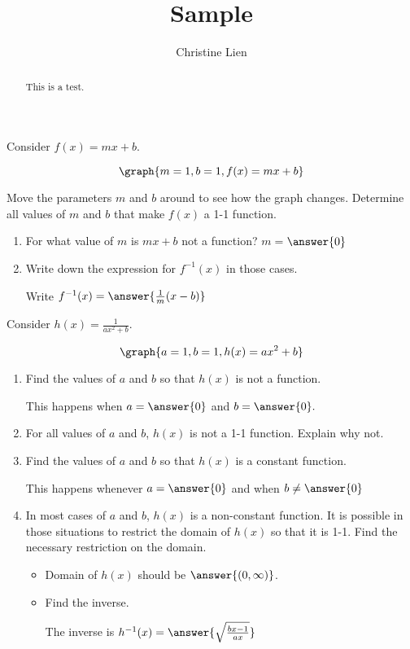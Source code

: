 \documentclass{ximera}
\title{Sample}
\author{Christine Lien}
\begin{document}
\begin{abstract}
This is a test. 
\end{abstract}
\maketitle

Consider $f(x)=mx+b$. 

\[\graph{m=1, b=1, f(x)=mx+b}\]

Move the parameters $m$ and $b$ around to see how the graph changes. 
Determine all values of $m$ and $b$ that make $f(x)$ a 1-1 function. 
\begin{exercise} 
\hfill
\begin{enumerate}
\item For what value of $m$ is $mx+b$ not a function? $m=$$\answer{0}$



\item Write down the expression for $f^{-1}(x)$ in those cases. 

Write $f^{-1}(x)= \answer{\frac{1}{m}(x-b)}$

\end{enumerate}

\end{exercise}

\begin{exercise}
Consider $h(x)=\frac{1}{ax^2+b}$. 

\[\graph{a=1, b=1, h(x)=ax^2+b}\]

\begin{enumerate}
\item Find the values of $a$ and $b$ so that $h(x)$ is not a function. 

This happens when $a=\answer{0}$ and $b=\answer{0}.$

\item For all values of $a$ and $b$, $h(x)$ is not a 1-1 function. Explain why not.


\item Find the values of $a$ and $b$ so that $h(x)$ is a constant function. 

This happens whenever $a=\answer{0}$ and when $b\neq\answer{0}$

\item In most cases of $a$ and $b$, $h(x)$ is a non-constant function. It is possible in those situations to restrict the domain of $h(x)$ so that it is 1-1. Find the necessary restriction on the domain. 

\begin{itemize}
\item Domain of $h(x)$ should be $\answer{(0, \infty)}$.

\item Find the inverse. 

The inverse is $h^{-1}(x) = \answer{\sqrt{\frac{bx-1}{ax}}}$

\end{itemize}
\end{enumerate} 

\end{exercise}
\end{document}
